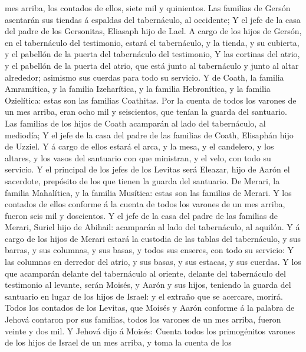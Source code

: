 mes arriba, los contados de ellos, siete mil y quinientos. 
Las familias de Gersón asentarán sus tiendas á espaldas del tabernáculo,
al occidente;  Y el jefe de la casa del padre de los
Gersonitas, Eliasaph hijo de Lael.  A cargo de los hijos de
Gersón, en el tabernáculo del testimonio, estará el tabernáculo, y la
tienda, y su cubierta, y el pabellón de la puerta del tabernáculo del
testimonio,  Y las cortinas del atrio, y el pabellón de la
puerta del atrio, que está junto al tabernáculo y junto al altar
alrededor; asimismo sus cuerdas para todo su servicio.  Y
de Coath, la familia Amramítica, y la familia Izeharítica, y la familia
Hebronítica, y la familia Ozielítica: estas son las familias Coathitas.
 Por la cuenta de todos los varones de un mes arriba, eran
ocho mil y seiscientos, que tenían la guarda del santuario.
 Las familias de los hijos de Coath acamparán al lado del
tabernáculo, al mediodía;  Y el jefe de la casa del padre
de las familias de Coath, Elisaphán hijo de Uzziel.  Y á
cargo de ellos estará el arca, y la mesa, y el candelero, y los altares,
y los vasos del santuario con que ministran, y el velo, con todo su
servicio.  Y el principal de los jefes de los Levitas será
Eleazar, hijo de Aarón el sacerdote, prepósito de los que tienen la
guarda del santuario.  De Merari, la familia Mahalítica, y
la familia Musítica: estas son las familias de Merari.  Y
los contados de ellos conforme á la cuenta de todos los varones de un
mes arriba, fueron seis mil y doscientos.  Y el jefe de la
casa del padre de las familias de Merari, Suriel hijo de Abihail:
acamparán al lado del tabernáculo, al aquilón.  Y á cargo
de los hijos de Merari estará la custodia de las tablas del tabernáculo,
y sus barras, y sus columnas, y sus basas, y todos sus enseres, con todo
su servicio:  Y las columnas en derredor del atrio, y sus
basas, y sus estacas, y sus cuerdas.  Y los que acamparán
delante del tabernáculo al oriente, delante del tabernáculo del
testimonio al levante, serán Moisés, y Aarón y sus hijos, teniendo la
guarda del santuario en lugar de los hijos de Israel: y el extraño que
se acercare, morirá.  Todos los contados de los Levitas,
que Moisés y Aarón conforme á la palabra de Jehová contaron por sus
familias, todos los varones de un mes arriba, fueron veinte y dos mil.
 Y Jehová dijo á Moisés: Cuenta todos los primogénitos
varones de los hijos de Israel de un mes arriba, y toma la cuenta de los

